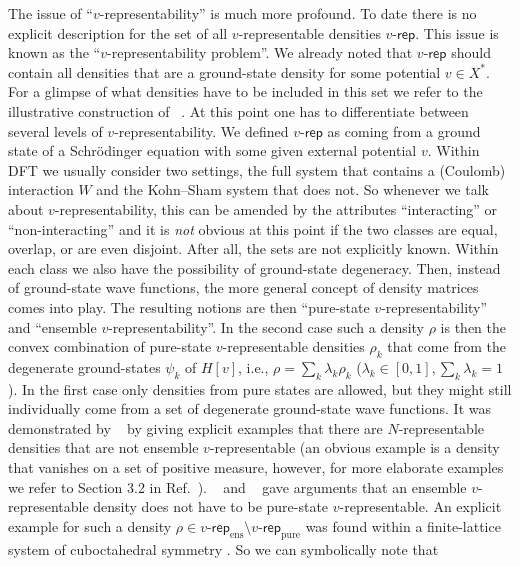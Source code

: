 \documentclass[journal=apcach,manuscript=article,layout=twocolumn]{achemso}
\newcommand{\vrep}{\ensuremath{v\text{-}\mathsf{rep}}}
\newcommand{\vreppure}{\ensuremath{\vrep_\mathrm{pure}}}
\newcommand{\vrepens}{\ensuremath{\vrep_\mathrm{ens}}}
\begin{document}
The issue of ``$v$-representability'' is much more profound. To date there is no explicit description for the set of all $v$-representable densities $\vrep$. This issue is known as the ``$v$-representability problem''. We already noted that $\vrep$ should contain all densities that are a ground-state density for some potential $v\in X^*$. For a glimpse of what densities have to be included in this set we refer to the illustrative construction of \citeauthor{ENGLISCH1983}~\cite{ENGLISCH1983}. At this point one has to differentiate between several levels of $v$-representability. We defined \vrep{} as coming from a ground state of a Schr\"odinger equation with some given external potential $v$. Within DFT we usually consider two settings, the full system that contains a (Coulomb) interaction $W$ and the Kohn--Sham system that does not. So whenever we talk about $v$-representability, this can be amended by the attributes ``interacting'' or ``non-interacting'' and it is {\it not} obvious at this point if the two classes are equal, overlap, or are even disjoint. After all, the sets are not explicitly known. Within each class we also have the possibility of ground-state degeneracy. Then, instead of ground-state wave functions, the more general concept of density matrices %
comes into play. The resulting notions are then ``pure-state $v$-representability'' and ``ensemble $v$-representability''. In the second case such a density $\rho$ is then the convex combination of pure-state $v$-representable densities $\rho_k$ that come from the degenerate ground-states $\psi_k$ of $H[v]$, i.e., $\rho=\sum_k\lambda_k\rho_k$ ($\lambda_k \in [0,1], \sum_k\lambda_k=1$). In the first case only densities from pure states are allowed, but they might still individually come from a set of degenerate ground-state wave functions. It was demonstrated by \citeauthor{ENGLISCH1983}~\cite{ENGLISCH1983} by giving explicit examples that there are $N$-representable densities that are not ensemble $v$-representable (an obvious example is a density that vanishes on a set of positive measure, however, for more elaborate examples we refer to Section 3.2 in Ref.~). \citeauthor{levy1982}~\cite{levy1982} and \citeauthor{Lieb1983}~\cite{Lieb1983} gave arguments that an ensemble $v$-representable density does not have to be pure-state $v$-representable. An explicit example for such a density $\rho \in \vrepens \setminus \vreppure$ was found within a finite-lattice system of cuboctahedral symmetry \cite{penz-DFT-graphs}. So we can symbolically note that
\end{document}
